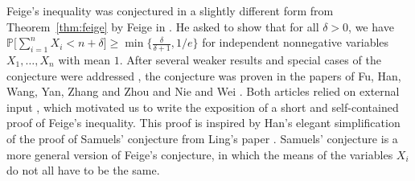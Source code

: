 \documentclass[10pt,a4paper]{article}
\newcommand{\Pb}{\mathbb P}
\begin{document}
Feige's inequality was conjectured in a slightly different form from Theorem~\ref{thm:feige} by Feige in \cite{F06}. He asked to show that for all $\delta>0$, we have $\Pb\big[\sum_{i=1}^n X_i<n+\delta\big]\geq \min\{\frac{\delta}{\delta+1}, 1/e\}$ for independent nonnegative variables $X_1, \dots, X_n$ with mean $1$. After several weaker results and special cases of the conjecture were addressed \cite{AAMM24, EF25, G20, GHLL20, HZZ10}, the conjecture was proven in the papers of Fu, Han, Wang, Yan, Zhang and Zhou \cite{FHWYZZ26} and Nie and Wei \cite{NW26}. Both articles relied on external input \cite{VT26}, which motivated us to write the exposition of a short and self-contained proof of Feige's inequality. This proof is inspired by Han's elegant simplification \cite{Han26} of the proof of Samuels' conjecture from Ling's paper \cite{Ling26}. Samuels' conjecture \cite{S66} is a more general version of Feige's conjecture, in which the means of the variables $X_i$ do not all have to be the same.
\end{document}
